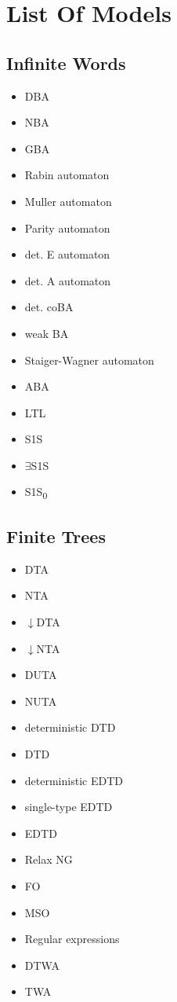 \documentclass{article}
\begin{document}
\section{List Of Models}
\subsection{Infinite Words}
\begin{itemize}
	\item DBA
	\item NBA
	\item GBA
	\item Rabin automaton
	\item Muller automaton
	\item Parity automaton
	\item det. E automaton
	\item det. A automaton
	\item det. coBA
	\item weak BA
	\item Staiger-Wagner automaton
	\item ABA
	\item LTL
	\item S1S
	\item $\exists$S1S
	\item S1S\textsubscript{0}
\end{itemize}

\subsection{Finite Trees}
\begin{itemize}
	\item DTA
	\item NTA
	\item $\downarrow$DTA
	\item $\downarrow$NTA
	\item DUTA
	\item NUTA
	\item deterministic DTD
	\item DTD
	\item deterministic EDTD
	\item single-type EDTD
	\item EDTD
	\item Relax NG
	\item FO
	\item MSO
	\item Regular expressions
	\item DTWA
	\item TWA
\end{itemize}
\end{document}
